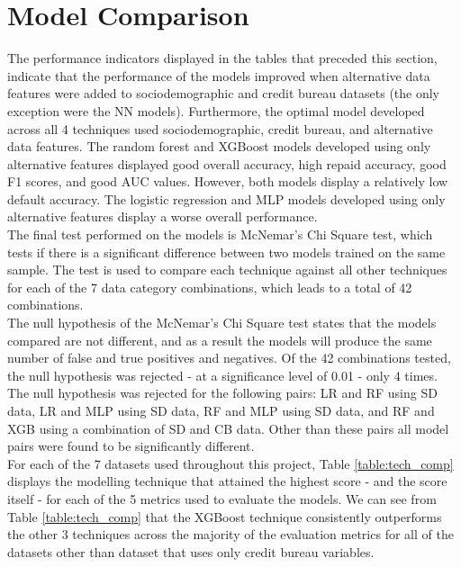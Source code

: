 \section{Model Comparison}

 The performance indicators displayed in the tables that preceded this section, indicate that the performance of the models improved when alternative data features were added to sociodemographic and credit bureau datasets (the only exception were the NN models). Furthermore, the optimal model developed across all 4 techniques used sociodemographic, credit bureau, and alternative data features. The random forest and XGBoost models developed using only alternative features displayed good overall accuracy, high repaid accuracy, good F1 scores, and good AUC values. However, both models display a relatively low default accuracy. The logistic regression and MLP models developed using only alternative features display a worse overall performance. \\ 

The final test performed on the models is McNemar's Chi Square test, which tests if there is a significant difference between two models trained on the same sample. The test is used to compare each technique against all other techniques for each of the 7 data category combinations, which leads to a total of 42 combinations.    \\

The null hypothesis of the McNemar's Chi Square test states that the models compared are not different, and as a result the models will produce the same number of false and true positives and negatives. Of the 42 combinations tested, the null hypothesis was rejected - at a significance level of 0.01 - only 4 times. The null hypothesis was rejected for the following pairs: LR and RF using SD data, LR and MLP using SD data, RF and MLP using SD data, and RF and XGB using a combination of SD and CB data. Other than these pairs all model pairs were found to be significantly different.   \\

For each of the 7 datasets used throughout this project, Table \ref{table:tech_comp} displays the modelling technique that attained the highest score - and the score itself - for each of the 5 metrics used to evaluate the models. We can see from Table \ref{table:tech_comp} that the XGBoost technique consistently outperforms the other 3 techniques across the majority of the evaluation metrics for all of the datasets other than dataset that uses only credit bureau variables. 

